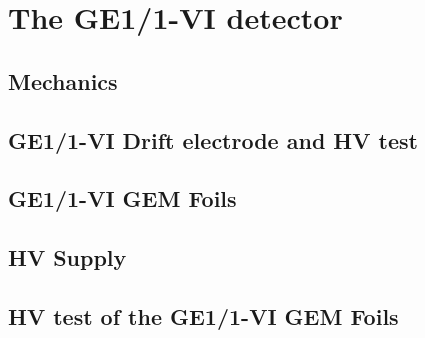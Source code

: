 
\smallskip
\section {The GE1/1-VI detector}






\smallskip
\subsection{Mechanics}





\smallskip
\subsection{GE1/1-VI Drift electrode and HV test}







\smallskip
\subsection{GE1/1-VI GEM Foils}





\smallskip
\subsection{HV Supply}







\smallskip
\subsection{HV test of the GE1/1-VI GEM Foils}






